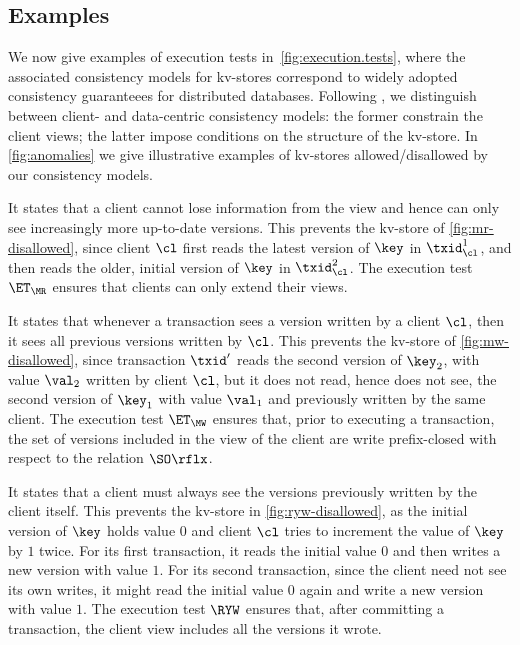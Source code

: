 \subsection{Examples}\label{subsec:cm_examples}

We now give examples of execution tests in~\cref{fig:execution.tests},
where the associated consistency models for kv-stores correspond to
widely adopted consistency guaranteees for distributed databases.
Following \cite{distrprinciples}, we distinguish between
client- and data-centric consistency models: 
the former constrain the client views; 
the latter impose conditions on the structure of the kv-store.  
In \cref{fig:anomalies} we give illustrative
examples of kv-stores allowed/disallowed by our
consistency models.

It states that a client cannot lose information from the view and 
hence can only see increasingly more up-to-date versions. 
This prevents \eg the kv-store of \cref{fig:mr-disallowed},
since client $\cl$ first reads the latest version of $\key$ in $\txid_{\cl}^{1}$, 
and then reads the older, initial version of $\key$ in $\txid_{\cl}^{2}$.  
The execution test $\ET_{\MR}$ ensures that clients  can only extend their views. 

It states that whenever a transaction sees a version written by a client $\cl$,
then it sees all previous versions written by $\cl$. 
This prevents \eg the kv-store of \cref{fig:mw-disallowed}, since 
transaction $\txid'$ reads the second version of $\key_2$, 
with value $\val_2$ written by client $\cl$, 
but it does not read, hence does not see, the second version of $\key_1$
with value $\val_1$ and previously written by the same client.
The execution test $\ET_{\MW}$  ensures that, prior to executing a transaction,
the set of versions included in the view of the client are write 
prefix-closed with respect to the relation $\SO\rflx$.

It states that a client must always see the versions previously written by the client itself.
This prevents the kv-store in \cref{fig:ryw-disallowed}, 
as the initial version of $\key$ holds value $0$ 
and client $\cl$ tries to increment the value of $\key$ by $1$ twice.  
For its first transaction, it reads the initial value $0$ and then writes a new version with value $1$. 
For its second transaction, since the client need not see its own writes, 
it might read the initial value $0$ again and write a new version with value $1$.
The execution test $\RYW$ ensures that, after committing a transaction, 
the client view includes all the versions it wrote.  
 
